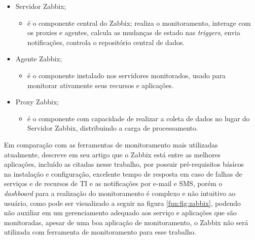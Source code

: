 \begin{enumerate}
\begin{itemize}
\item Servidor Zabbix;
    \begin{itemize}
        \item é o componente central do Zabbix; realiza o monitoramento, interage com os proxies e agentes, calcula as mudanças de estado nas \textit{triggers}, envia notificações, controla o repositório central de dados.
    \end{itemize}
\item Agente Zabbix;
\begin{itemize}
        \item é o componente instalado nos servidores monitorados, usado para monitorar ativamente seus recursos e aplicações.
    \end{itemize}
\item Proxy Zabbix;
\begin{itemize}
        \item é o componente com capacidade de realizar a coleta de dados no lugar do Servidor Zabbix, distribuindo a carga de processamento.
    \end{itemize}
\end{itemize}

Em comparação com as ferramentas de monitoramento mais utilizadas atualmente, \cite{marik2014comparative} descreve em seu artigo que o Zabbix está entre as melhores aplicações, incluído as citadas nesse trabalho, por possuir pré-requisitos básicos na instalação e configuração, excelente tempo de resposta em caso de falhas de serviços e de recursos de \acrshort{TI} e as notificações por e-mail e \acrshort{SMS}, porém o \textit{dashboard} para a realização do monitoramento é complexo e não intuitivo ao usuário, como pode ser visualizado a seguir na figura \ref{fun:fig:zabbix}, podendo não auxiliar em um gerenciamento adequado aos serviço e aplicações que são monitoradas, apesar de uma boa aplicação de monitoramento, o Zabbix não será utilizada com ferramenta de monitoramento para esse trabalho.    


\end{enumerate}
